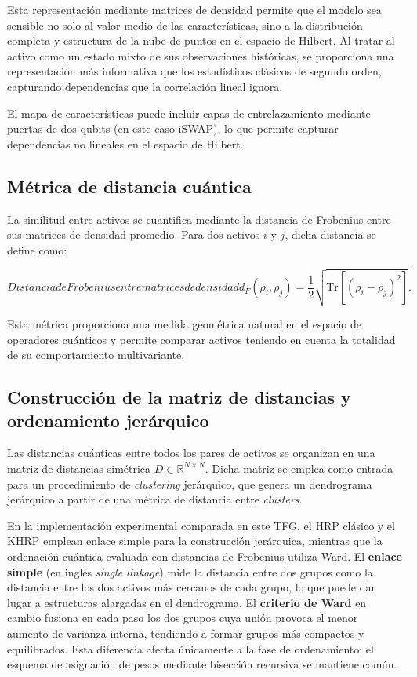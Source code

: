 Esta representación mediante matrices de densidad permite que el modelo sea sensible no solo al valor medio de las características, sino a la distribución completa y estructura de la nube de puntos en el espacio de Hilbert. Al tratar al activo como un estado mixto de sus observaciones históricas, se proporciona una representación más informativa que los estadísticos clásicos de segundo orden, capturando dependencias que la correlación lineal ignora.

El mapa de características puede incluir capas de entrelazamiento mediante puertas de dos qubits (en este caso iSWAP), lo que permite capturar dependencias no lineales en el espacio de Hilbert.

\subsection{Métrica de distancia cuántica}
\label{subsec:metrica_distancia_cuantica}
La similitud entre activos se cuantifica mediante la distancia de Frobenius entre sus matrices de densidad promedio. Para dos activos $i$ y $j$, dicha distancia se define como:

\begin{equation}[eq:distancia_frobenius_cuantica]{Distancia de Frobenius entre matrices de densidad}
d_F(\rho_i, \rho_j) = \frac{1}{2}
\sqrt{\mathrm{Tr}\left[(\rho_i - \rho_j)^2\right]}.
\end{equation}

Esta métrica proporciona una medida geométrica natural en el espacio de operadores cuánticos y permite comparar activos teniendo en cuenta la totalidad de su comportamiento multivariante.

\subsection{Construcción de la matriz de distancias y ordenamiento jerárquico}
\label{subsec:construccion_ordenamiento}

Las distancias cuánticas entre todos los pares de activos se organizan en una matriz de distancias simétrica $D \in \mathbb{R}^{N \times N}$. Dicha matriz se emplea como entrada para un procedimiento de \textit{clustering} jerárquico, que genera un dendrograma jerárquico a partir de una métrica de distancia entre \textit{clusters}.

En la implementación experimental comparada en este TFG, el \gls{HRP} clásico y el \gls{KHRP} emplean enlace simple para la construcción jerárquica, mientras que la ordenación cuántica evaluada con distancias de Frobenius utiliza Ward. El \textbf{enlace simple} (en inglés \textit{single linkage}) mide la distancia entre dos grupos como la distancia entre los dos activos más cercanos de cada grupo, lo que puede dar lugar a estructuras alargadas en el dendrograma. El \textbf{criterio de Ward} en cambio fusiona en cada paso los dos grupos cuya unión provoca el menor aumento de varianza interna, tendiendo a formar grupos más compactos y equilibrados. Esta diferencia afecta únicamente a la fase de ordenamiento; el esquema de asignación de pesos mediante bisección recursiva se mantiene común.

